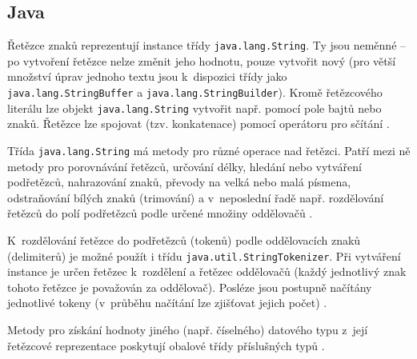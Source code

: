 \documentclass[onepage, a4paper, 12pt]{bakalarka}
\begin{document}
\subsection{Java}
Řetězce znaků reprezentují instance třídy \texttt{java.lang.String}. Ty jsou neměnné -- po vytvoření řetězce nelze změnit jeho hodnotu, pouze vytvořit nový (pro větší množství úprav jednoho textu jsou k~dispozici třídy jako \texttt{java.lang.StringBuffer} a \texttt{java.lang.StringBuilder}). Kromě řetězcového literálu lze objekt \texttt{java.lang.String} vytvořit např. pomocí pole bajtů nebo znaků. Řetězce lze spojovat (tzv. konkatenace) pomocí operátoru pro sčítání \uv{+} \cite{java-guide-strings, java-guide-string, java-guide-stringbuffer, java-guide-stringbuilder}.\par
Třída \texttt{java.lang.String} má metody pro různé operace nad řetězci. Patří mezi ně metody pro porovnávání řetězců, určování délky, hledání nebo vytváření podřetězců, nahrazování znaků, převody na velká nebo malá písmena, odstraňování bílých znaků (trimování) a v~neposlední řadě např. rozdělování řetězců do polí podřetězců podle určené množiny oddělovačů \cite{java-guide-string}.\par
K~rozdělování řetězce do podřetězců (tokenů) podle oddělovacích znaků (delimiterů) je možné použít i třídu \texttt{java.util.StringTokenizer}. Při vytváření instance je určen řetězec k~rozdělení a řetězec oddělovačů (každý jednotlivý znak tohoto řetězce je považován za oddělovač). Posléze jsou postupně načítány jednotlivé tokeny (v~průběhu načítání lze zjišťovat jejich počet) \cite{java-guide-stringtokenizer}.\par
Metody pro získání hodnoty jiného (např. číselného) datového typu z~její řetězcové reprezentace poskytují obalové třídy příslušných typů \cite{java-guide-string, java-guide-byte, java-guide-short, java-guide-integer, java-guide-long, java-guide-float, java-guide-double, java-guide-boolean, java-guide-character}.
\end{document}
